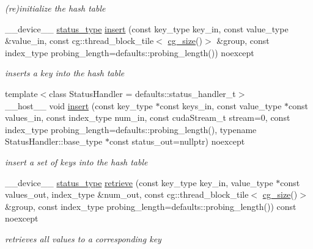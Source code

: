 \begin{DoxyCompactItemize}
\begin{DoxyCompactList}\small\item\em (re)initialize the hash table \end{DoxyCompactList}\item 
\+\_\+\+\_\+device\+\_\+\+\_\+ \hyperlink{classwarpcore_1_1Status}{status\+\_\+type} \hyperlink{classwarpcore_1_1MultiValueHashTable_a18aa96cecfd5b5cf0d65424a92784b07}{insert} (const key\+\_\+type key\+\_\+in, const value\+\_\+type \&value\+\_\+in, const cg\+::thread\+\_\+block\+\_\+tile$<$ \hyperlink{classwarpcore_1_1MultiValueHashTable_ad300c5a01bd933343ff08176fb4b4e29}{cg\+\_\+size}()$>$ \&group, const index\+\_\+type probing\+\_\+length=defaults\+::probing\+\_\+length()) noexcept
\begin{DoxyCompactList}\small\item\em inserts a key into the hash table \end{DoxyCompactList}\item 
{\footnotesize template$<$class Status\+Handler  = defaults\+::status\+\_\+handler\+\_\+t$>$ }\\\+\_\+\+\_\+host\+\_\+\+\_\+ void \hyperlink{classwarpcore_1_1MultiValueHashTable_a2121e41e089fd4ec029b382f52c8b717}{insert} (const key\+\_\+type $\ast$const keys\+\_\+in, const value\+\_\+type $\ast$const values\+\_\+in, const index\+\_\+type num\+\_\+in, const cuda\+Stream\+\_\+t stream=0, const index\+\_\+type probing\+\_\+length=defaults\+::probing\+\_\+length(), typename Status\+Handler\+::base\+\_\+type $\ast$const status\+\_\+out=nullptr) noexcept
\begin{DoxyCompactList}\small\item\em insert a set of keys into the hash table \end{DoxyCompactList}\item 
\+\_\+\+\_\+device\+\_\+\+\_\+ \hyperlink{classwarpcore_1_1Status}{status\+\_\+type} \hyperlink{classwarpcore_1_1MultiValueHashTable_a7f64ccf2789b8eaf65251600bb36ca23}{retrieve} (const key\+\_\+type key\+\_\+in, value\+\_\+type $\ast$const values\+\_\+out, index\+\_\+type \&num\+\_\+out, const cg\+::thread\+\_\+block\+\_\+tile$<$ \hyperlink{classwarpcore_1_1MultiValueHashTable_ad300c5a01bd933343ff08176fb4b4e29}{cg\+\_\+size}()$>$ \&group, const index\+\_\+type probing\+\_\+length=defaults\+::probing\+\_\+length()) const noexcept
\begin{DoxyCompactList}\small\item\em retrieves all values to a corresponding key \end{DoxyCompactList}\item 

\end{DoxyCompactItemize}
